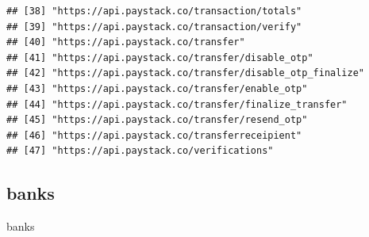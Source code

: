 \documentclass[]{book}
\newenvironment{Shaded}{\begin{snugshade}}{\end{snugshade}}
\newcommand{\NormalTok}[1]{#1}
\begin{document}
\begin{verbatim}
## [38] "https://api.paystack.co/transaction/totals"                 
## [39] "https://api.paystack.co/transaction/verify"                 
## [40] "https://api.paystack.co/transfer"                           
## [41] "https://api.paystack.co/transfer/disable_otp"               
## [42] "https://api.paystack.co/transfer/disable_otp_finalize"      
## [43] "https://api.paystack.co/transfer/enable_otp"                
## [44] "https://api.paystack.co/transfer/finalize_transfer"         
## [45] "https://api.paystack.co/transfer/resend_otp"                
## [46] "https://api.paystack.co/transferreceipient"                 
## [47] "https://api.paystack.co/verifications"
\end{verbatim}

\subsection{banks}\label{banks}

\begin{Shaded}
\begin{Highlighting}[]
\NormalTok{banks}
\end{Highlighting}
\end{Shaded}
\end{document}
